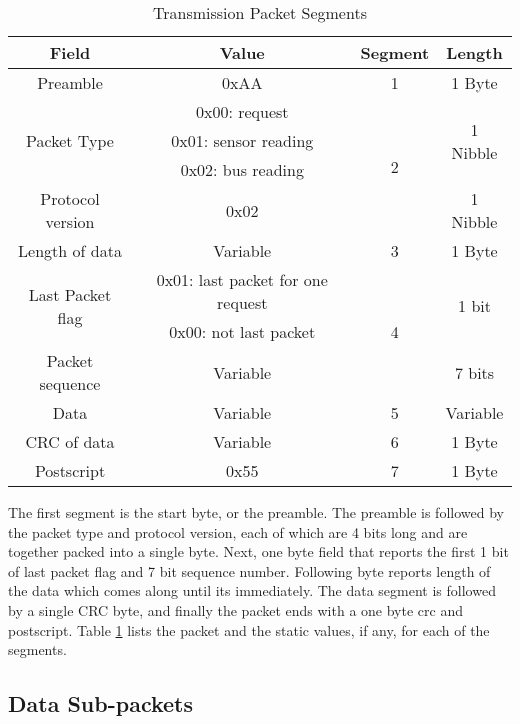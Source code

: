 \begin{table}[H]
    \centering
    {
    \begin{tabular}{|c|c|c|c|}
        \hline
        \rowcolor{black!8}
        \textbf{Field} & \textbf{Value} & \textbf{Segment} & \textbf{Length}\\
        \hline
        Preamble & 0xAA & 1 & 1 Byte\\ \hline
        \multirow{3}{*}{Packet Type} & 0x00: request & \multirow{4}{*}{2} & \multirow{3}{*}{1 Nibble} \\
         & 0x01: sensor reading & & \\ 
         & 0x02: bus reading & & \\ \cline{1-2} \cline{4-4}
        Protocol version & 0x02 &  & 1 Nibble\\ \hline
        Length of data & Variable & 3 & 1 Byte\\ \hline
        \multirow{2}{*}{Last Packet flag} & 0x01: last packet for one request & \multirow{3}{*}{4} & \multirow{2}{*}{1 bit} \\
         & 0x00: not last packet & & \\ \cline{1-2} \cline{4-4}
        Packet sequence & Variable &  & 7 bits \\ \hline
        Data & Variable & 5 & Variable \\ \hline
        CRC of data & Variable & 6 & 1 Byte\\ \hline
        Postscript & 0x55 & 7 & 1 Byte\\ \hline
    \end{tabular}
    }
    \caption{Transmission Packet Segments}
    \label{table:seg}
\end{table}


The first segment is the start byte, or the preamble. The preamble is followed by the packet type and protocol version, each of which are 4 bits long and are together packed into a single byte.
Next, one byte field that reports the first 1 bit of last packet flag and 7 bit sequence number. Following byte reports length of the data which comes along until its
immediately. The data segment is followed by a single CRC byte, and finally the packet ends with a one byte
crc and postscript. Table \ref{table:seg} lists the packet and the static values, if any, for each of the segments.
\\


\subsection{Data Sub-packets} \label{ssec:sub-pack}

